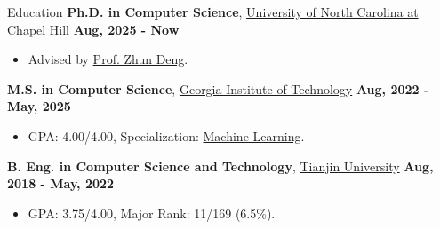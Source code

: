 \documentclass{resume}
\begin{document}
 
\vspace{-15em}
\begin{rSection}{Education}
{\textbf {Ph.D. in Computer Science}}, \href{https://www.gatech.edu/}{University of North Carolina at Chapel Hill}   \hfill {\bf Aug, 2025 - Now} 
\begin{itemize}
\item \vspace{-0.5em} Advised by \href{https://www.zhundeng.org/home}{Prof. Zhun Deng}. 
\end{itemize}
\vspace{-0.5em}
{\textbf {M.S. in Computer Science}}, \href{https://www.gatech.edu/}{Georgia Institute of Technology}   \hfill {\bf Aug, 2022 - May, 2025} 
\begin{itemize}
\item \vspace{-0.5em} GPA: 4.00/4.00, Specialization: \href{https://www.cc.gatech.edu/ms-computer-science-specializations}{Machine Learning}.
\end{itemize}
\vspace{-0.5em}
{\textbf {B. Eng. in Computer Science and Technology}}, \href{https://www.tju.edu.cn/english/index.htm}{Tianjin University} \hfill {\bf Aug, 2018 - May, 2022} 
\begin{itemize}
\item \vspace{-0.5em} GPA: 3.75/4.00, Major Rank: 11/169 (6.5\%). 
\end{itemize}
\end{rSection}
\end{document}
